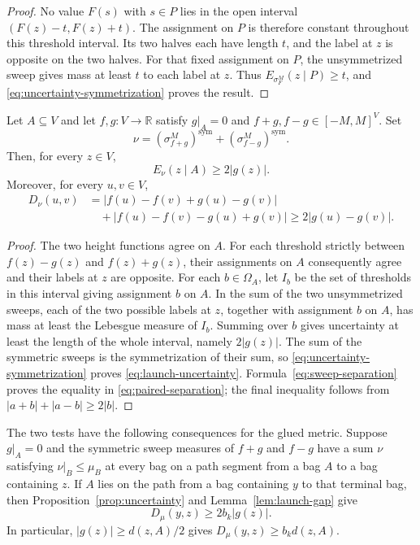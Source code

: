 \begin{proof}
No value $F(s)$ with $s\in P$ lies in the open interval
$(F(z)-t,F(z)+t)$.
The assignment on $P$ is therefore constant throughout this threshold
interval. Its two halves each have length $t$, and the label at $z$
is opposite on the two halves. For that fixed assignment on $P$, the
unsymmetrized sweep gives mass at least $t$ to each label at $z$.
Thus $E_{\sigma_F^M}(z\mid P)\geq t$, and
\eqref{eq:uncertainty-symmetrization} proves the result.
\end{proof}

\begin{lemma}\label{lem:launch-gap}
Let $A\subseteq V$ and let $f,g:V\to\mathbb R$ satisfy $g|_A=0$ and
$f+g,f-g\in[-M,M]^V$.
Set
\[
 \nu=(\sigma_{f+g}^M)^{\mathrm{sym}}
       +(\sigma_{f-g}^M)^{\mathrm{sym}}.
\]
Then, for every $z\in V$,
\begin{equation}\label{eq:launch-uncertainty}
 E_\nu(z\mid A)\geq2|g(z)|.
\end{equation}
Moreover, for every $u,v\in V$,
\begin{equation}\label{eq:paired-separation}
 \begin{split}
 D_\nu(u,v)
 &=|f(u)-f(v)+g(u)-g(v)|\\
 &\quad+|f(u)-f(v)-g(u)+g(v)|
 \geq2|g(u)-g(v)|.
 \end{split}
\end{equation}
\end{lemma}

\begin{proof}
The two height functions agree on $A$.
For each threshold strictly between $f(z)-g(z)$ and $f(z)+g(z)$,
their assignments on $A$ consequently agree and their labels at $z$
are opposite.
For each $b\in\Omega_A$, let $I_b$ be the set of thresholds in this
interval giving assignment $b$ on $A$.
In the sum of the two unsymmetrized sweeps, each of the two possible
labels at $z$, together with assignment $b$ on $A$, has mass at least
the Lebesgue measure of $I_b$.
Summing over $b$ gives uncertainty at least the length of the whole
interval, namely $2|g(z)|$.
The sum of the symmetric sweeps is the symmetrization of their sum,
so \eqref{eq:uncertainty-symmetrization} proves
\eqref{eq:launch-uncertainty}.
Formula~\eqref{eq:sweep-separation} proves the equality in
\eqref{eq:paired-separation}; the final inequality follows from
$|a+b|+|a-b|\geq2|b|$.
\end{proof}

The two tests have the following consequences for the glued metric.
Suppose $g|_A=0$ and the symmetric sweep measures of $f+g$ and $f-g$
have a sum $\nu$ satisfying $\nu|_B\leq\mu_B$ at every bag on a path
segment from a bag $A$ to a bag containing $z$. If $A$ lies on the path
from a bag containing $y$ to that terminal bag, then
Proposition~\ref{prop:uncertainty} and Lemma~\ref{lem:launch-gap} give
\begin{equation}\label{eq:launch-transport}
 D_\mu(y,z)\geq2b_k|g(z)|.
\end{equation}
In particular, $|g(z)|\geq d(z,A)/2$ gives
$D_\mu(y,z)\geq b_kd(z,A)$.

